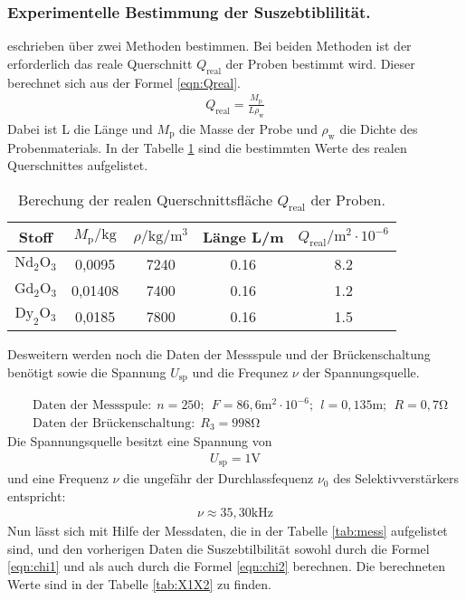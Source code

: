 \subsubsection{Experimentelle Bestimmung der Suszebtiblilität.}
eschrieben über zwei Methoden bestimmen. Bei beiden Methoden ist der
erforderlich das reale Querschnitt $Q_\mathrm{real}$ der Proben bestimmt wird.
Dieser berechnet sich aus der Formel \eqref{eqn:Qreal}.
\begin{align}
  Q_\mathrm{real}=\frac{M_\mathrm{p}}{L\rho_\mathrm{w}}\label{eqn:Qreal}
\end{align}
Dabei ist L die Länge und $M_\mathrm{p}$ die Masse der Probe und
$\rho_\mathrm{w}$ die Dichte des Probenmaterials.
In der Tabelle \ref{tab:Q} sind die bestimmten Werte des realen Querschnittes aufgelistet.
\begin{table}
  \centering
  \caption{Berechung der realen Querschnittsfläche $Q_\mathrm{real}$ der Proben.}
  \label{tab:Q}
  \begin{tabular}{c c c c c}
  Stoff &  $M_\mathrm{p}/\si{\kilo\gram}$ & $\rho/\si{\kilo\gram\per\meter\tothe{3}}$ & Länge L/\si{\meter} & $Q_\mathrm{real}/\si{\meter\tothe{2}}\cdot 10^{-6}$\\
     \midrule
     $\mathrm{Nd_2O_3}$ & 0,0095  & 7240 & 0.16 & 8.2\\
     $\mathrm{Gd_2O_3}$ & 0,01408 & 7400 & 0.16 & 1.2\\
     $\mathrm{Dy_2O_3}$ & 0,0185  & 7800 & 0.16 & 1.5\\
     \bottomrule
  \end{tabular}
\end{table}
\FloatBarrier
Desweitern werden noch die Daten der Messspule und der Brückenschaltung benötigt sowie
die Spannung $U_\mathrm{sp}$ und die Frequnez $\nu$ der Spannungsquelle.

\begin{align*}
&\text{Daten der Messspule:}  \ \ n=250; \  \ F=86,6\si{\meter\tothe{2}}\cdot10^{-6}; \ \ l=0,135\si{\meter}; \ \ R= 0,7\si{\ohm} \\
&\text{Daten der Brückenschaltung:} \ \  R_3=998\si{\ohm}\
\end{align*}
Die Spannungsquelle besitzt eine Spannung von
\begin{align*}
U_\mathrm{sp}=1\si{\volt}
\end{align*}
und eine Frequenz $\nu$ die ungefähr der Durchlassfequenz $\nu_0$
des Selektivverstärkers entspricht:
\begin{align*}
\nu\approx35,30\si{\kilo\hertz}
\end{align*}
Nun lässt sich mit Hilfe der Messdaten, die in der Tabelle \ref{tab:mess}
aufgelistet sind, und den vorherigen Daten
die Suszebtilbilität \chi sowohl durch die Formel \eqref{eqn:chi1}
und als auch  durch die Formel \eqref{eqn:chi2} berechnen.
Die berechneten Werte sind in der Tabelle \ref{tab:X1X2}
zu finden.

